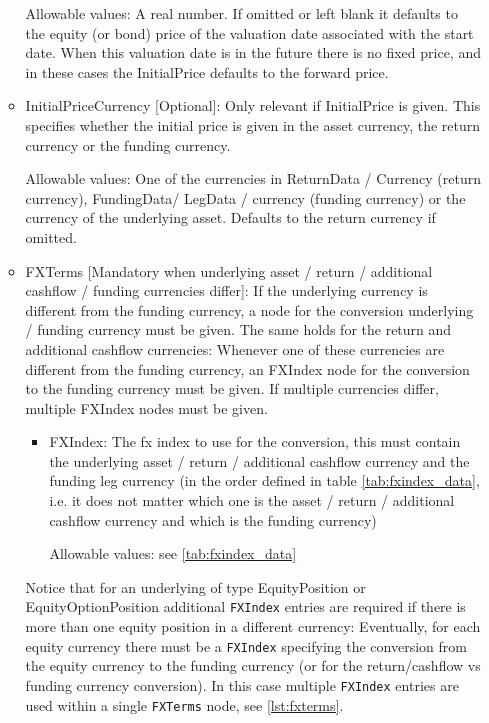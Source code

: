 \begin{itemize}
\begin{itemize}
    Allowable values: A real number. If omitted or left blank it defaults to the equity (or bond) price of the valuation
    date associated with the start date. When this valuation date is in the future there is no fixed price, 
    and in these cases the InitialPrice defaults to the forward price.
    
  \item InitialPriceCurrency [Optional]: Only relevant if InitialPrice is given. This specifies whether the initial
    price is given in the asset currency, the return currency or the funding currency.
    
    Allowable values: One of the currencies in ReturnData / Currency (return currency), FundingData/ LegData / currency
    (funding currency) or the currency of the underlying asset. Defaults to the return currency if omitted.

  \item FXTerms [Mandatory when underlying asset / return / additional cashflow / funding currencies differ]: If the
    underlying currency is different from the funding currency, a node for the conversion underlying / funding currency
    must be given. The same holds for the return and additional cashflow currencies: Whenever one of these currencies
    are different from the funding currency, an FXIndex node for the conversion to the funding currency must be given. If multiple currencies differ, 
    multiple FXIndex nodes must be given.

    \begin{itemize}
    \item FXIndex: The fx index to use for the conversion, this must contain the underlying asset / return / additional cashflow
      currency and the funding leg currency (in the order defined in table \ref{tab:fxindex_data}, i.e. it does not
      matter which one is the asset / return / additional cashflow currency and which is the funding currency)
        
        Allowable values: see \ref{tab:fxindex_data}
    \end{itemize}

    Notice that for an underlying of type EquityPosition or EquityOptionPosition additional \verb+FXIndex+
    entries are required if there is more than one equity position in a different currency: Eventually, for each equity currency there must be a \verb+FXIndex+ specifying the
    conversion from the equity currency to the funding currency (or for the return/cashflow vs funding currency conversion). In this case multiple \verb+FXIndex+ entries are used within a single \lstinline!FXTerms! node, see \ref{lst:fxterms}. 
    

\end{itemize}
\end{itemize}
